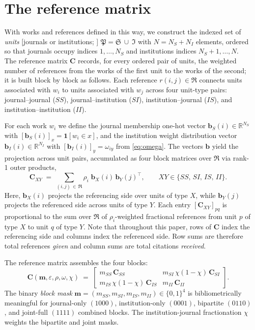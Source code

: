 \section{The reference matrix}
\label{sec:matrix}

With works and references defined in this way, we construct the indexed 
set of \emph{units} [journals or institutions; \textcite{pinskiCitationInfluenceJournal1976}]
$\mathfrak{P}=\mathfrak{S}\ \cup\ \mathfrak{I}$ with $N=N_S+N_I$ elements,
ordered so that journals occupy indices $1,\dots,N_S$ and institutions
indices $N_S+1,\dots,N$. The reference matrix $\mathbf{C}$ records, for every ordered pair of units, the weighted number of references from the works of the first unit to the works of the second; it is built block by block as follows. Each reference $r(i,j) \in \mathfrak{R}$ connects units
associated with $w_i$ to units associated with $w_j$
across four unit-type pairs: journal--journal ($SS$), journal--institution
($SI$), institution--journal ($IS$), and institution--institution ($II$).

For each work $w_i$ we define the journal membership one-hot vector
$\mathbf{b}_S(i)\in\mathbb{R}^{N_S}$ with $[\mathbf{b}_S(i)]_x=\mathbf{1}[w_i\in x]$,
and the institution weight distribution vector
$\mathbf{b}_I(i)\in\mathbb{R}^{N_I}$ with $[\mathbf{b}_I(i)]_y=\omega_{iy}$
from \eqref{eq:omega}. The vectors $\mathbf{b}$ yield the projection across unit
pairs, accumulated as four block matrices over $\mathfrak{R}$ via
rank-1 outer products,
\begin{equation}
	\mathbf{C}_{XY} \;=\; \sum_{(i,j)\,\in\,\mathfrak{R}}
	\rho_i\;\mathbf{b}_X(i)\,\mathbf{b}_Y(j)^\top,
	\qquad XY\in\{SS,\,SI,\,IS,\,II\}.
	\label{eq:Cblock}
\end{equation}
Here, $\mathbf{b}_X(i)$ projects the referencing side over units of type $X$, 
while $\mathbf{b}_Y(j)$ projects the referenced side
across units of type $Y$. Each entry $[\mathbf{C}_{XY}]_{pq}$ is proportional
to the sum over $\mathfrak{R}$ of $\rho_i$-weighted fractional references from unit $p$ of type $X$ to unit $q$ of type $Y$. Note that throughout this paper, rows of $\mathbf{C}$ index the referencing side and columns index the referenced side. Row sums are therefore total references \emph{given} and column sums are total citations \emph{received}.

The reference matrix assembles the four blocks:
\begin{equation}
	\mathbf{C}(\mathbf{m}, \varepsilon, \rho, \omega, \chi) \;=\;
	\begin{bmatrix}
		m_{SS}\,\mathbf{C}_{SS} &
		m_{SI}\,\chi(1-\chi)\,\mathbf{C}_{SI} \\[4pt]
		m_{IS}\,\chi(1-\chi)\,\mathbf{C}_{IS} &
		m_{II}\,\mathbf{C}_{II}
	\end{bmatrix}.
	\label{eq:C}
\end{equation}
The binary \textit{block mask} $\mathbf{m}=(m_{SS},m_{SI},m_{IS},m_{II})\in\{0,1\}^4$
is bibliometrically meaningful for journal-only $(1000)$, institution-only $(0001)$,
bipartite $(0110)$, and joint-full $(1111)$ combined blocks.
The institution-journal fractionation $\chi$ weights the bipartite and joint masks.

